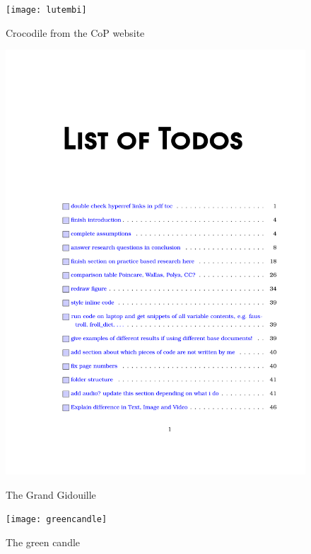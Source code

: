 \begin{figure}[h]
  \centering
  \begin{minipage}{.275\linewidth}
  \texttt{[image: lutembi]}
  \caption[Crocodile]{Crocodile from the CoP website}
  \label{img1}
  \end{minipage}
  \hspace{.05\linewidth}
  \begin{minipage}{.275\linewidth}
  \includegraphics[width=\linewidth]{spiral}
  \caption[Gidouille]{The Grand Gidouille}
  \label{img2}
  \end{minipage}
  \hspace{.05\linewidth}
  \begin{minipage}{.275\linewidth}
  \texttt{[image: greencandle]}
  \caption[Green Candle]{The green candle}
  \label{img3}
  \end{minipage}
\end{figure}

